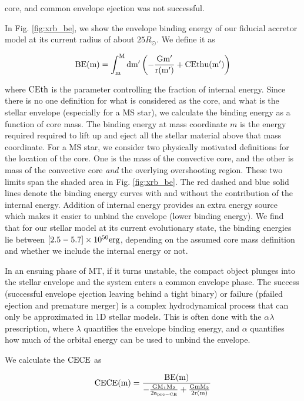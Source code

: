 \documentclass[linenumbers,trackchanges,twocolumn]{aastex701}
\begin{document}
core, and common envelope ejection was not successful.

In Fig. \ref{fig:xrb_be}, we show the envelope binding energy of our fiducial accretor model at its current radius of about $25R_{\odot}$. We define it as

\begin{equation}
    \rm BE(m) = \int_m^M dm' \left(-\frac{Gm'}{r(m')} + \alpha_{\rm th}u(m')\right)
\end{equation}

where $\alpha_{\rm th}$ is the parameter controlling the fraction of internal energy. Since there is no one definition for what is considered as the core, and what is the stellar envelope (especially for a MS star), we calculate the binding energy as a function of core mass. The binding energy at mass coordinate $m$ is the energy required required to lift up and eject all the stellar material above that mass coordinate. For a MS star, we consider two physically motivated definitions for the location of the core. One is the mass of the convective core, and the other is mass of the convective core \textit{and} the overlying overshooting region. These two limits span the shaded area in Fig. \ref{fig:xrb_be}. The red dashed and blue solid lines denote the binding energy curves with and without the contribution of the internal energy. Addition of internal energy provides an extra energy source which makes it easier to unbind the envelope (lower binding energy). We find that for our stellar model at its current evolutionary state, the binding energies lie between $[2.5-5.7] \times 10^{50} \rm erg$, depending on the assumed core mass definition and whether we include the internal energy or not.

In an ensuing phase of MT, if it turns unstable, the compact object plunges into the stellar envelope and the system enters a common envelope phase. The success (successful envelope ejection leaving behind a tight binary) or failure (pfailed ejection and premature merger) is a complex hydrodynamical process that can only be approximated in 1D stellar models. This is often done with the $\alpha \lambda$ prescription, where $\lambda$ quantifies the envelope binding energy, and $\alpha$ quantifies how much of the orbital energy can be used to unbind the envelope.

We calculate the $\alpha_{\rm CE}$ as

\begin{equation}
    \alpha_{\rm CE} \def \alpha_{\rm CE}(m) = \frac{\rm BE(m)}{-\frac{\rm GM_1 M_2}{2a_{\rm pre-CE}} + \frac{\rm Gm M_2}{2r(m)}}
\end{equation}
\end{document}
